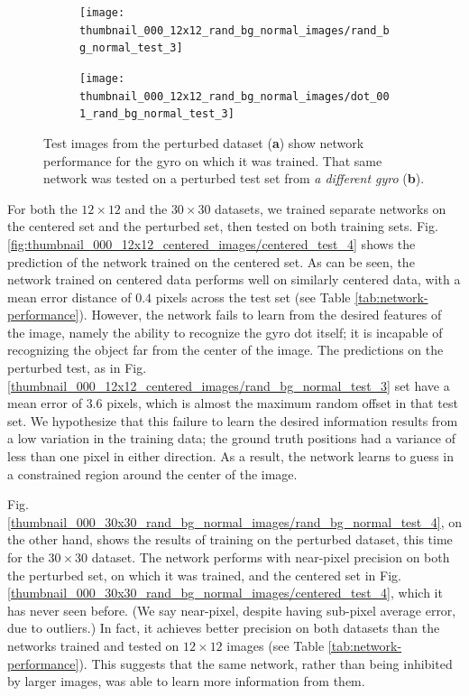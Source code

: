 \documentclass[twocolumn, 10pt]{asme2ej}
\begin{document}
\begin{figure}
  \centering
  \begin{subfigure}[b]{0.49\columnwidth}
    \texttt{[image: thumbnail\_000\_12x12\_rand\_bg\_normal\_images/rand\_bg\_normal\_test\_3]}
    \caption{}
    \label{thumbnail_000_12x12_rand_bg_normal_images/rand_bg_normal_test_3}
  \end{subfigure}
  \hfill
  \begin{subfigure}[b]{0.49\columnwidth}
    \texttt{[image: thumbnail\_000\_12x12\_rand\_bg\_normal\_images/dot\_001\_rand\_bg\_normal\_test\_3]}
    \caption{}
    \label{thumbnail_000_12x12_rand_bg_normal_images/dot_001_rand_bg_normal_test_3}
  \end{subfigure}
  \caption{Test images from the perturbed dataset (\textbf{a}) show network
    performance for the gyro on which it was trained. That same network was
    tested on a perturbed test set from \emph{a different gyro} (\textbf{b}).}
  \label{fig:different-dot}
\end{figure}

For both the $12 \times 12$ and the $30\times 30$ datasets, we trained separate
networks on the centered set and the perturbed set, then tested on both training
sets. Fig. \ref{fig:thumbnail_000_12x12_centered_images/centered_test_4} shows
the prediction of the network trained on the centered set. As can be seen, the
network trained on centered data performs well on similarly centered data, with
a mean error distance of $0.4$ pixels across the test set (see Table
\ref{tab:network-performance}). However, the network fails to learn from the
desired features of the image, namely the ability to recognize the gyro dot
itself; it is incapable of recognizing the object far from the center of the
image. The predictions on the perturbed test, as in
Fig. \ref{thumbnail_000_12x12_centered_images/rand_bg_normal_test_3} set have a
mean error of $3.6$ pixels, which is almost the maximum random offset in that
test set. We hypothesize that this failure to learn the desired information
results from a low variation in the training data; the ground truth positions
had a variance of less than one pixel in either direction. As a result, the
network learns to guess in a constrained region around the center of the image.

Fig. \ref{thumbnail_000_30x30_rand_bg_normal_images/rand_bg_normal_test_4}, on
the other hand, shows the results of training on the perturbed dataset, this
time for the $30 \times 30$ dataset. The network performs with near-pixel
precision on both the perturbed set, on which it was trained, and the centered
set in Fig. \ref{thumbnail_000_30x30_rand_bg_normal_images/centered_test_4},
which it has never seen before. (We say near-pixel, despite having sub-pixel
average error, due to outliers.) In fact, it achieves better precision on both
datasets than the networks trained and tested on $12 \times 12$ images (see
Table \ref{tab:network-performance}). This suggests that the same network,
rather than being inhibited by larger images, was able to learn more information
from them.
\end{document}
